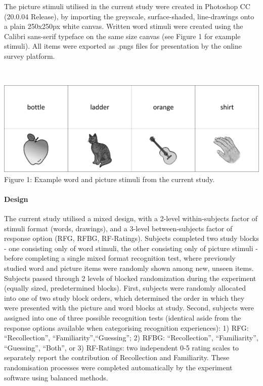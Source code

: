 \documentclass[
  11pt,
]{article}
\begin{document}
The picture stimuli utilised in the current study were created in
Photoshop CC (20.0.04 Release), by importing the greyscale,
surface-shaded, line-drawings onto a plain 250x250px white canvas.
Written word stimuli were created using the Calibri sans-serif typeface
on the same size canvas (see Figure 1 for example stimuli). All items
were exported as .pngs files for presentation by the online survey
platform.

~ ~

\includegraphics[width=1\linewidth]{./resources/images/exp1__stim_examples}
Figure 1: Example word and picture stimuli from the current study. ~ ~

\hypertarget{design}{%
\paragraph{Design}\label{design}}

\hfill\break The current study utilised a mixed design, with a 2-level
within-subjects factor of stimuli format (words, drawings), and a
3-level between-subjects factor of response option (RFG, RFBG,
RF-Ratings). Subjects completed two study blocks - one consisting only
of word stimuli, the other consisting only of picture stimuli - before
completing a single mixed format recognition test, where previously
studied word and picture items were randomly shown among new, unseen
items. Subjects passed through 2 levels of blocked randomization during
the experiment (equally sized, predetermined blocks). First, subjects
were randomly allocated into one of two study block orders, which
determined the order in which they were presented with the picture and
word blocks at study. Second, subjects were assigned into one of three
possible recognition tests (identical aside from the response options
available when categorising recognition experiences): 1) RFG:
``Recollection'', ``Familiarity'',``Guessing''; 2) RFBG:
``Recollection'', ``Familiarity'', ``Guessing'', ``Both'', or 3)
RF-Ratings: two independent 0-5 rating scales to separately report the
contribution of Recollection and Familiarity. These randomisation
processes were completed automatically by the experiment software using
balanced methods.
\end{document}
